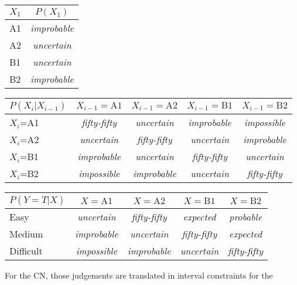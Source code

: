 \documentclass[runningheads]{llncs}
\begin{document}
	{\small \begin{table*}[htp!] 
			\renewcommand{\arraystretch}{1.2}
			\centering
			{%
				\begin{tabular}{@{}lc@{}}
					\toprule
					$X_1$&$P(X_1)$\\
					\midrule
					A1&\emph{improbable}\\
					A2&\emph{uncertain}\\
					B1&\emph{uncertain}\\
					B2&\emph{improbable}\\
					\bottomrule
				\end{tabular}
				\quad
				\begin{tabular}{@{}lcccc@{}}
					\toprule	
					$P(X_i|X_{i-1})$&\phantom{.}$X_{i-1}=\mathrm{A1}$\phantom{.}&\phantom{.}$X_{i-1}=\mathrm{A2}$\phantom{.}&\phantom{.}$X_{i-1}=\mathrm{B1}$\phantom{.}&\phantom{.}$X_{i-1}=\mathrm{B2}$\phantom{.}\\
					\midrule
					$X_i$=A1&\emph{fifty-fifty}&\emph{uncertain}&\emph{improbable}&\emph{impossible}\\
					$X_i$=A2&\emph{uncertain}&\emph{fifty-fifty}&\emph{uncertain}&\emph{improbable}\\
					$X_i$=B1&\emph{improbable}&\emph{uncertain}&\emph{fifty-fifty}&\emph{uncertain}\\
					$X_i$=B2&\emph{impossible}&\emph{improbable}&\emph{uncertain}&\emph{fifty-fifty}\\
					\bottomrule
			\end{tabular}}
			\vskip 2mm
			\begin{tabular}{@{}lcccc@{}}\toprule
				$P(Y=T|X)$\phantom{aa}&\phantom{a}$X=\mathrm{A1}$\phantom{a}&\phantom{a}$X=\mathrm{A2}$\phantom{a}&\phantom{a}$X=\mathrm{B1}$\phantom{a}&\phantom{a}$X=\mathrm{B2}$\phantom{a}\\
				\midrule
				Easy&\emph{uncertain}&\emph{fifty-fifty}&\emph{expected}&\emph{probable}\\
				Medium&\emph{improbable}&\emph{uncertain}&\emph{fifty-fifty}& 
				\emph{expected}\\
				Difficult&\emph{impossible}&\emph{improbable}&\emph{uncertain}& 
				\emph{fifty-fifty}\\
				\bottomrule
			\end{tabular}
			\vskip 2mm
			\caption{Expert judgements.}\label{tb:CPTs}
	\end{table*}}
	For the CN, those judgements are translated in interval constraints for the 
\end{document}
